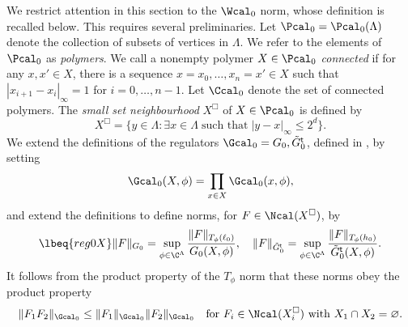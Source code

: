 We restrict attention in this section to the $\Wcal_0$ norm,
whose definition is recalled below.
This requires several preliminaries.
Let $\Pcal_0 = \Pcal_0(\Lambda)$ denote the collection of subsets of vertices in $\Lambda$.
We refer to the elements of $\Pcal_0$ as \emph{polymers}.
We call a nonempty polymer $X\in \Pcal_0$ \emph{connected}
if for any $x, x' \in X$, there is a sequence
$x = x_0, \ldots, x_n = x' \in X$ such that
$|x_{i+1} - x_i|_\infty = 1$ for $i = 0, \ldots, n - 1$.
Let $\Ccal_0$ denote the set of connected polymers.
The \emph{small set neighbourhood} $X^\Box$ of $X\in\Pcal_0$ is defined by
\begin{equation}
    X^\Box =
    \{y \in \Lambda : \exists x \in \Lambda \; \text{such that}\; |y-x|_\infty \le 2^d\}.
\end{equation}
We extend the definitions of the regulators $\Gcal_0 = G_0, \tilde G_0^{\sf t}$,
defined in , by setting
\begin{equation} \label{e:Gcalprod}
\Gcal_0(X, \phi) = \prod_{x\in X} \Gcal_0(x, \phi),
\end{equation}
and extend the definitions  to define norms, for $F \in \Ncal(X^\Box)$, by
\begin{equation}
\lbeq{reg0X}
    \|F\|_{G_0} = \sup_{\phi\in\C^\Lambda} \frac{\|F\|_{T_\phi(\ell_0)}}{G_0(X,\phi)}
    , \quad
    \|F\|_{\tilde{G}^{\sf t}_0} = \sup_{\phi\in\C^\Lambda} \frac{\|F\|_{T_\phi(h_0)}}{\tilde{G}^{\sf t}_0(X,\phi)}
    .
\end{equation}
It follows from the product property of the $T_\phi$ norm that these norms obey the product property
\begin{equation}
    \|F_1F_2\|_{\Gcal_0} \le   \|F_1\|_{\Gcal_0} \|F_2\|_{\Gcal_0}
    \quad \text{for $F_i\in \Ncal(X_i^\Box)$ with $X_1 \cap X_2=\varnothing$.}
\end{equation}

